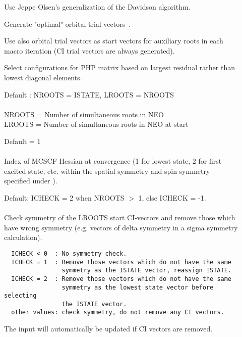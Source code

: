 \begin{description}
\item[]
  Use Jeppe Olsen's generalization of the Davidson
  algorithm.

\item[]
  Generate "optimal" orbital trial
  vectors~\cite{hjajpjhajcp87}. 

\item[]
  Use also orbital trial vectors as start vectors for auxiliary roots
  in each macro iteration (CI trial vectors are always generated).

\item[]
  Select configurations for PHP matrix based on largest residual
  rather than lowest diagonal elements.

\item[]
  Default : NROOTS = ISTATE, LROOTS = NROOTS\\
   \\
  NROOTS = Number of simultaneous roots in NEO\\
  LROOTS = Number of simultaneous roots in NEO at start

\item[]
  Default = 1\\
   \\
  Index of MCSCF Hessian at convergence (1 for
  lowest state, 2 for first
  excited state, etc. within the spatial symmetry and
  spin symmetry
  specified under ).

\item[]
  Default: ICHECK = 2 when NROOTS $>$ 1, else ICHECK = -1.\\
   \\
  Check symmetry of the LROOTS start CI-vectors and remove those which
  have wrong symmetry (e.g. vectors of delta symmetry in a sigma
  symmetry calculation).
\begin{verbatim}
  ICHECK < 0  : No symmetry check.
  ICHECK = 1  : Remove those vectors which do not have the same
                symmetry as the ISTATE vector, reassign ISTATE.
  ICHECK = 2  : Remove those vectors which do not have the same
                symmetry as the lowest state vector before selecting
                the ISTATE vector.
  other values: check symmetry, do not remove any CI vectors.
\end{verbatim}
  The  input will automatically be
  updated if CI vectors are removed.


\end{description}

